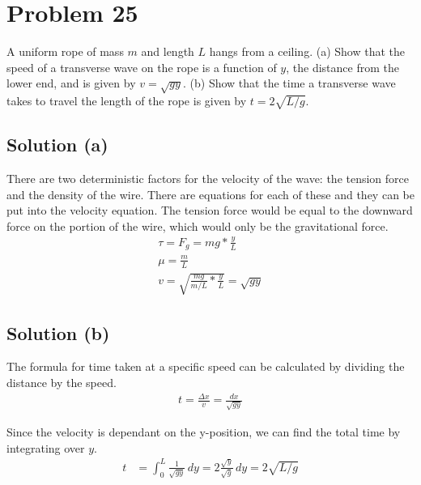 \documentclass[12pt]{article}
\begin{document}
    \pagebreak
    \section{Problem 25}
        A uniform rope of mass $m$ and length $L$ hangs from a ceiling. 
        (a) Show that the speed of a transverse wave on the rope is a function of $y$, the distance from the lower end, and is given by $v = \sqrt{gy}$.
        (b) Show that the time a transverse wave takes to travel the length of the rope is given by $t = 2\sqrt{L/g}$.

        \subsection{Solution (a)}
            There are two deterministic factors for the velocity of the wave: the tension force and the density of the wire. 
            There are equations for each of these and they can be put into the velocity equation.
            The tension force would be equal to the downward force on the portion of the wire, which would only be the gravitational force.
            \begin{gather}
                \tau    =   F_g
                    =   mg * \frac{y}{L}\\
                \mu =   \frac{m}{L}\\
                v   =   \sqrt{\frac{mg}{m/L} * \frac{y}{L}}
                    =   \sqrt{gy}
            \end{gather}

        \subsection{Solution (b)}
            The formula for time taken at a specific speed can be calculated by dividing the distance by the speed.
            \begin{gather}
                t   =   \frac{\Delta x}{v}
                    =   \frac{dx}{\sqrt{gy}}
            \end{gather}

            Since the velocity is dependant on the y-position, we can find the total time by integrating over $y$. 
            \begin{align}
                t   &=  \int_{0}^{L}\frac{1}{\sqrt{gy}}\,dy
                    =   2\frac{\sqrt{y}}{\sqrt{g}}\,dy
                    =   2\sqrt{L/g}
            \end{align}
\end{document}
